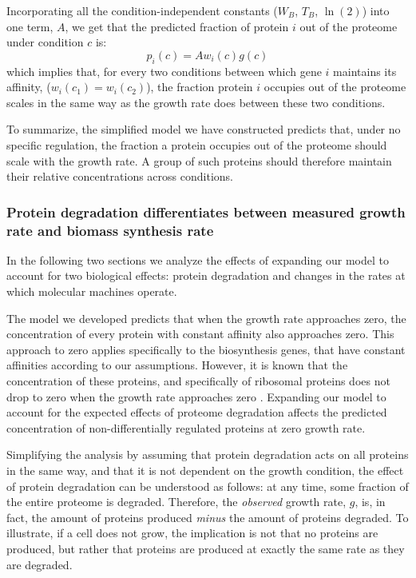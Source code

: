 \documentclass[a4paper]{article}
\begin{document}
Incorporating all the condition-independent constants ($W_B$, $T_B$, $\ln(2)$) into one term, $A$, we get that the predicted fraction of protein $i$ out of the proteome under condition $c$ is:
\begin{equation}
  \label{eq:final-conc}
  p_i(c)=Aw_i(c)g(c)
\end{equation}
which implies that, for every two conditions between which gene $i$ maintains its affinity, ($w_i(c_1)=w_i(c_2)$), the fraction protein $i$ occupies out of the proteome scales in the same way as the growth rate does between these two conditions.

To summarize, the simplified model we have constructed predicts that, under no specific regulation, the fraction a protein occupies out of the proteome should scale with the growth rate.
A group of such proteins should therefore maintain their relative concentrations across conditions.

\subsubsection{Protein degradation differentiates between measured growth rate and biomass synthesis rate}
\label{degradation}
In the following two sections we analyze the effects of expanding our model to account for two biological effects: protein degradation and changes in the rates at which molecular machines operate.

The model we developed predicts that when the growth rate approaches zero, the concentration of every protein with constant affinity also approaches zero.
This approach to zero applies specifically to the biosynthesis genes, that have constant affinities according to our assumptions.
However, it is known that the concentration of these proteins, and specifically of ribosomal proteins does not drop to zero when the growth rate approaches zero \cite{ingraham1983growth,Pedersen1978a}.
Expanding our model to account for the expected effects of proteome degradation affects the predicted concentration of non-differentially regulated proteins at zero growth rate.

Simplifying the analysis by assuming that protein degradation acts on all proteins in the same way, and that it is not dependent on the growth condition, the effect of protein degradation can be understood as follows: at any time, some fraction of the entire proteome is degraded.
Therefore, the \emph{observed} growth rate, $g$, is, in fact, the amount of proteins produced \emph{minus} the amount of proteins degraded.
To illustrate, if a cell does not grow, the implication is not that no proteins are produced, but rather that proteins are produced at exactly the same rate as they are degraded.
\end{document}
